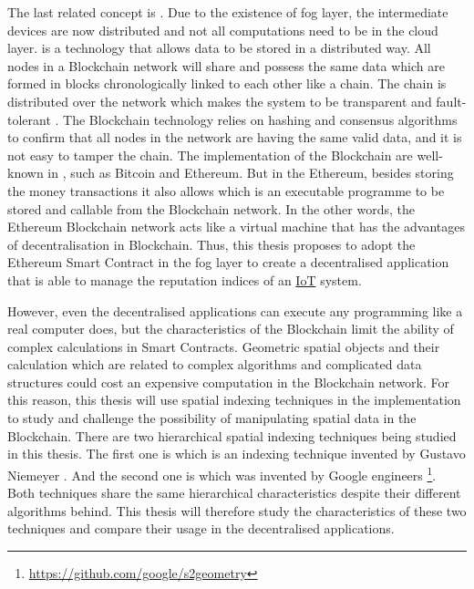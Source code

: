 \npara The last related concept is .
Due to the existence of fog layer, the intermediate devices are now distributed and not all computations need to be in the cloud layer.
 is a technology that allows data to be stored in a distributed way.
All nodes in a Blockchain network will share and possess the same data which are formed in blocks chronologically linked to each other like a chain.
The chain is distributed over the network which makes the system to be transparent and fault-tolerant \citep{BlockchainAdvantages}.
The Blockchain technology relies on hashing and consensus algorithms to confirm that all nodes in the network are having the same valid data, and it is not easy to tamper the chain.
The implementation of the Blockchain are well-known in , such as Bitcoin and Ethereum.
But in the Ethereum, besides storing the money transactions it also allows  which is an executable programme to be stored and callable from the Blockchain network.
In the other words, the Ethereum Blockchain network acts like a virtual machine that has the advantages of decentralisation in Blockchain.
Thus, this thesis proposes to adopt the Ethereum Smart Contract in the fog layer to create a decentralised application that is able to manage the reputation indices of an \hyperref[Acronym-IoT]{IoT} system.

\npara However, even the decentralised applications can execute any programming like a real computer does, but the characteristics of the Blockchain limit the ability of complex calculations in Smart Contracts.
Geometric spatial objects and their calculation which are related to complex algorithms and complicated data structures could cost an expensive computation in the Blockchain network.
For this reason, this thesis will use spatial indexing techniques in the implementation to study and challenge the possibility of manipulating spatial data in the Blockchain.
There are two hierarchical spatial indexing techniques being studied in this thesis.
The first one is  which is an indexing technique invented by Gustavo Niemeyer \citep{GeohasUUID}.
And the second one is  which was invented by Google engineers \footnote{\url{https://github.com/google/s2geometry}}.
Both techniques share the same hierarchical characteristics despite their different algorithms behind.
This thesis will therefore study the characteristics of these two techniques and compare their usage in the decentralised applications.

